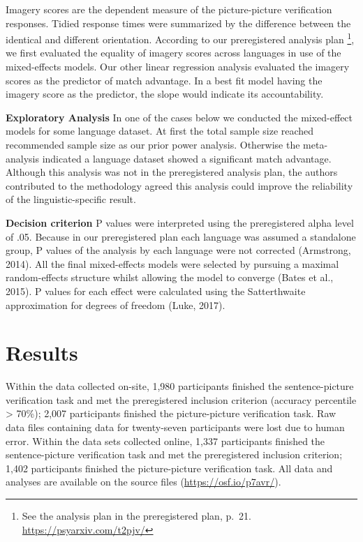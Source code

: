 \documentclass[
  man]{apa6}
\begin{document}
Imagery scores are the dependent measure of the picture-picture verification responses. Tidied response times were summarized by the difference between the identical and different orientation. According to our preregistered analysis plan \footnote{See the analysis plan in the preregistered plan, p.~21. \url{https://psyarxiv.com/t2pjv/}}, we first evaluated the equality of imagery scores across languages in use of the mixed-effects models. Our other linear regression analysis evaluated the imagery scores as the predictor of match advantage. In a best fit model having the imagery score as the predictor, the slope would indicate its accountability.

\textbf{Exploratory Analysis} In one of the cases below we conducted the mixed-effect models for some language dataset. At first the total sample size reached recommended sample size as our prior power analysis. Otherwise the meta-analysis indicated a language dataset showed a significant match advantage. Although this analysis was not in the preregistered analysis plan, the authors contributed to the methodology agreed this analysis could improve the reliability of the linguistic-specific result.

\textbf{Decision criterion} P values were interpreted using the preregistered alpha level of .05. Because in our preregistered plan each language was assumed a standalone group, P values of the analysis by each language were not corrected (Armstrong, 2014). All the final mixed-effects models were selected by pursuing a maximal random-effects structure whilst allowing the model to converge (Bates et al., 2015). P values for each effect were calculated using the Satterthwaite approximation for degrees of freedom (Luke, 2017).

\hypertarget{results}{%
\section{Results}\label{results}}

Within the data collected on-site, 1,980 participants finished the sentence-picture verification task and met the preregistered inclusion criterion (accuracy percentile \textgreater{} 70\%); 2,007 participants finished the picture-picture verification task. Raw data files containing data for twenty-seven participants were lost due to human error. Within the data sets collected online, 1,337 participants finished the sentence-picture verification task and met the preregistered inclusion criterion; 1,402 participants finished the picture-picture verification task. All data and analyses are available on the source files (\url{https://osf.io/p7avr/}).
\end{document}
